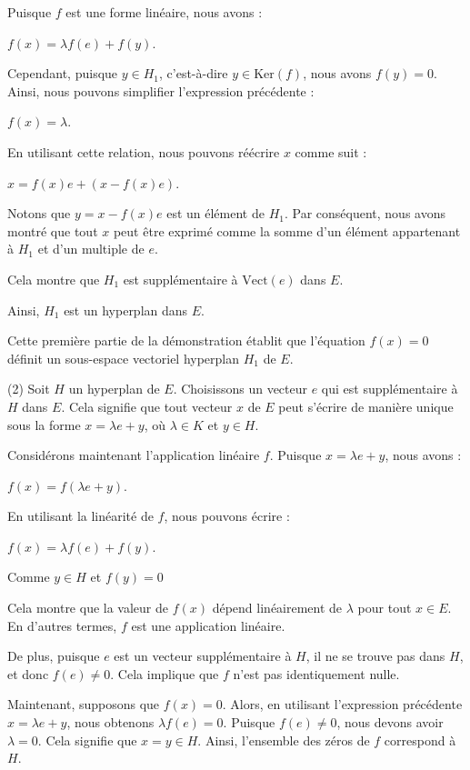 \documentclass{article}
\theoremstyle{definition}
\theoremstyle{plain}
\begin{document}
Puisque $f$ est une forme linéaire, nous avons :

$f(x) = \lambda f(e) + f(y)$.

Cependant, puisque $y \in H_1$, c'est-à-dire $y \in \text{Ker}(f)$, nous avons $f(y) = 0$. Ainsi, nous pouvons simplifier l'expression précédente :

$f(x) = \lambda$.

En utilisant cette relation, nous pouvons réécrire $x$ comme suit :

$x = f(x)e + (x - f(x)e)$.

Notons que $y = x - f(x)e$ est un élément de $H_1$. Par conséquent, nous avons montré que tout $x$ peut être exprimé comme la somme d'un élément appartenant à $H_1$ et d'un multiple de $e$.

Cela montre que $H_1$ est supplémentaire à $\text{Vect}(e)$ dans $E$.

Ainsi, $H_1$ est un hyperplan dans $E$.

Cette première partie de la démonstration établit que l'équation $f(x) = 0$ définit un sous-espace vectoriel hyperplan $H_1$ de $E$.\\



\indent

(2) Soit $H$ un hyperplan de $E$. Choisissons un vecteur $e$ qui est supplémentaire à $H$ dans $E$. Cela signifie que tout vecteur $x$ de $E$ peut s'écrire de manière unique sous la forme $x = \lambda e + y$, où $\lambda \in K$ et $y \in H$.

Considérons maintenant l'application linéaire $f$. Puisque $x = \lambda e + y$, nous avons :

$f(x) = f(\lambda e + y)$.

En utilisant la linéarité de $f$, nous pouvons écrire :

$f(x) = \lambda f(e) + f(y)$.

Comme $y \in H$ et $f(y) = 0$ 

Cela montre que la valeur de $f(x)$ dépend linéairement de $\lambda$ pour tout $x \in E$. En d'autres termes, $f$ est une application linéaire.

De plus, puisque $e$ est un vecteur supplémentaire à $H$, il ne se trouve pas dans $H$, et donc $f(e) \neq 0$. Cela implique que $f$ n'est pas identiquement nulle.

Maintenant, supposons que $f(x) = 0$. Alors, en utilisant l'expression précédente $x = \lambda e + y$, nous obtenons $\lambda f(e) = 0$. Puisque $f(e) \neq 0$, 
nous devons avoir $\lambda = 0$. Cela signifie que $x = y \in H$. Ainsi, l'ensemble des zéros de $f$ correspond à $H$.
\end{document}
